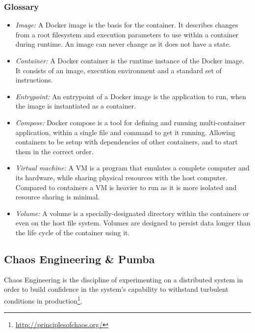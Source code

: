 \subsubsection{Glossary}
\begin{itemize}
    \item \textit{Image:} 
    A Docker image is the basis for the container. It describes changes from a root filesystem and execution parameters to use within a container during runtime. An image can never change as it does not have a state.
    
    \item \textit{Container:}
    A Docker container is the runtime instance of the Docker image. It consists of an image, execution environment and a standard set of instructions.
    
    \item \textit{Entrypoint:}
    An entrypoint of a Docker image is the application to run, when the image is instantiated as a container.
    
    \item \textit{Compose:}
    Docker compose is a tool for defining and running multi-container application, within a single file and command to get it running. Allowing containers to be setup with dependencies of other containers, and to start them in the correct order.
    
    \item \textit{Virtual machine:}
    A \acl{VM} is a program that emulates a complete computer and its hardware, while sharing physical resources with the host computer. Compared to containers a \ac{VM} is heavier to run as it is more isolated and resource sharing is minimal.
    
    \item \textit{Volume:}
    A volume is a specially-designated directory within the containers or even on the host file system. Volumes are designed to persist data longer than the life cycle of the container using it.

\end{itemize}


\subsection{Chaos Engineering \& Pumba}
\label{sec:framework_pumba}
Chaos Engineering is the discipline of experimenting on a distributed system in order to build confidence in the system’s capability to withstand turbulent conditions in production\footnote{\url{http://principlesofchaos.org/}}.

